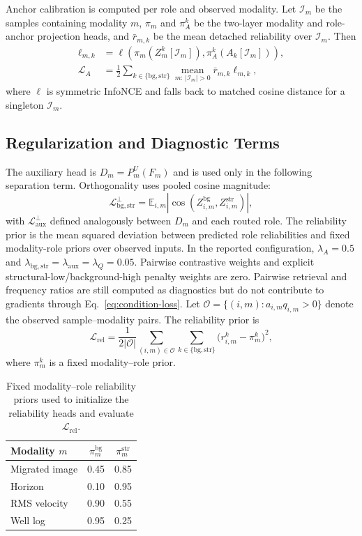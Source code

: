 \documentclass[letterpaper]{article}
\begin{document}
Anchor calibration is computed per role and observed modality. Let $\mathcal I_m$ be the samples containing modality $m$, $\pi_m$ and $\pi_A^k$ be the two-layer modality and role-anchor projection heads, and $\bar r_{m,k}$ be the mean detached reliability over $\mathcal I_m$. Then
\begin{align}
\ell_{m,k}
&=\ell\!\left(\pi_m(Z_m^k[\mathcal I_m]),
\pi_A^k(A_k[\mathcal I_m])\right),\\
\mathcal L_A
&=\frac{1}{2}\sum_{k\in\{\mathrm{bg},\mathrm{str}\}}
\operatorname*{mean}_{m:\,|\mathcal I_m|>0}
\bar r_{m,k}\ell_{m,k},
\end{align}
where $\ell$ is symmetric InfoNCE and falls back to matched cosine distance for a singleton $\mathcal I_m$.

\subsection{Regularization and Diagnostic Terms}
The auxiliary head is $D_m=P_m^U(F_m)$ and is used only in the following separation term. Orthogonality uses pooled cosine magnitude:
\begin{equation}
\mathcal L_{\mathrm{bg,str}}^{\perp}
=\mathbb E_{i,m}|\cos(Z_{i,m}^{\mathrm{bg}},Z_{i,m}^{\mathrm{str}})|,
\end{equation}
with $\mathcal L_{\mathrm{aux}}^{\perp}$ defined analogously between $D_m$ and each routed role. The reliability prior is the mean squared deviation between predicted role reliabilities and fixed modality-role priors over observed inputs. In the reported configuration, $\lambda_A=0.5$ and $\lambda_{\mathrm{bg,str}}=\lambda_{\mathrm{aux}}=\lambda_Q=0.05$. Pairwise contrastive weights and explicit structural-low/background-high penalty weights are zero. Pairwise retrieval and frequency ratios are still computed as diagnostics but do not contribute to gradients through Eq.~\ref{eq:condition-loss}. Let $\mathcal O=\{(i,m):a_{i,m}q_{i,m}>0\}$ denote the observed sample--modality pairs. The reliability prior is
\begin{equation}
\mathcal L_{\mathrm{rel}}
 =\frac{1}{2|\mathcal O|}
 \sum_{(i,m)\in\mathcal O}
 \sum_{k\in\{\mathrm{bg},\mathrm{str}\}}
 \bigl(r_{i,m}^k-\pi_m^k\bigr)^2,
\end{equation}
where $\pi_m^k$ is a fixed modality--role prior.

\begin{table}[t]
\centering
\small
\begin{tabular}{@{}lcc@{}}
\toprule
Modality $m$ & $\pi_m^{\mathrm{bg}}$ & $\pi_m^{\mathrm{str}}$ \\
\midrule
Migrated image & 0.45 & 0.85 \\
Horizon & 0.10 & 0.95 \\
RMS velocity & 0.90 & 0.55 \\
Well log & 0.95 & 0.25 \\
\bottomrule
\end{tabular}
\caption{Fixed modality--role reliability priors used to initialize the reliability heads and evaluate $\mathcal L_{\mathrm{rel}}$.}
\label{tab:reliability-priors}
\end{table}
\end{document}
